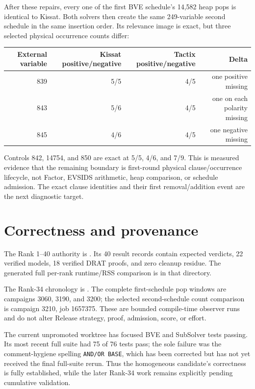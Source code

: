 \documentclass[11pt]{article}
\newcommand{\code}[1]{\texttt{#1}}
\begin{document}
After these repairs, every one of the first BVE schedule's 14,582 heap pops is
identical to Kissat.  Both solvers then create the same 249-variable second
schedule in the same insertion order.  Its relevance image is exact, but three
selected physical occurrence counts differ:

\begin{center}
\begin{tabular}{rrrr}
\toprule
External variable & Kissat positive/negative & Tactix positive/negative & Delta \\
\midrule
839 & 5/5 & 4/5 & one positive missing \\
843 & 5/6 & 4/5 & one on each polarity missing \\
845 & 4/6 & 4/5 & one negative missing \\
\bottomrule
\end{tabular}
\end{center}

Controls 842, 14754, and 850 are exact at 5/5, 4/6, and 7/9.  This is measured
evidence that the remaining boundary is first-round physical clause/occurrence
lifecycle, not Factor, EVSIDS arithmetic, heap comparison, or schedule
admission.  The exact clause identities and their first removal/addition event
are the next diagnostic target.

\section{Correctness and provenance}

The Rank 1--40 authority is
.
Its 40 result records contain expected verdicts, 22 verified models, 18
verified DRAT proofs, and zero cleanup residue.  The generated full per-rank
runtime/RSS comparison is  in that directory.

The Rank-34 chronology is
.  The complete
first-schedule pop windows are campaigns 3060, 3190, and 3200; the selected
second-schedule count comparison is campaign 3210, job 1657375.  These are
bounded compile-time observer runs and do not alter Release strategy, proof,
admission, score, or effort.

The current unpromoted worktree has focused BVE and SubSolver tests passing.
Its most recent full suite had 75 of 76 tests pass; the sole failure was the
comment-hygiene spelling \code{AND/OR BASE}, which has been corrected but has
not yet received the final full-suite rerun.  Thus the homogeneous candidate's
correctness is fully established, while the later Rank-34 work remains
explicitly pending cumulative validation.
\end{document}
